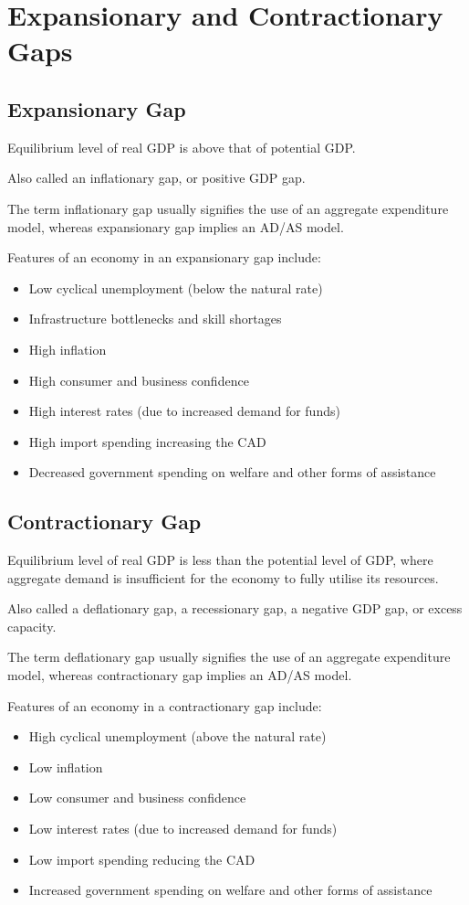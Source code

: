 \documentclass[a4paper,11pt]{article}
\begin{document}
\section{Expansionary and Contractionary Gaps}

\subsection{Expansionary Gap}

Equilibrium level of real GDP is above that of potential GDP.

Also called an inflationary gap, or positive GDP gap.

The term inflationary gap usually signifies the use of an aggregate expenditure
model, whereas expansionary gap implies an AD/AS model.

Features of an economy in an expansionary gap include:

\begin{itemize}
\item Low cyclical unemployment (below the natural rate)
\item Infrastructure bottlenecks and skill shortages
\item High inflation
\item High consumer and business confidence
\item High interest rates (due to increased demand for funds)
\item High import spending increasing the CAD
\item Decreased government spending on welfare and other forms of assistance
\end{itemize}


\subsection{Contractionary Gap}

Equilibrium level of real GDP is less than the potential level of GDP, where
aggregate demand is insufficient for the economy to fully utilise its resources.

Also called a deflationary gap, a recessionary gap, a negative GDP gap, or
excess capacity.

The term deflationary gap usually signifies the use of an aggregate expenditure
model, whereas contractionary gap implies an AD/AS model.

Features of an economy in a contractionary gap include:

\begin{itemize}
\item High cyclical unemployment (above the natural rate)
\item Low inflation
\item Low consumer and business confidence
\item Low interest rates (due to increased demand for funds)
\item Low import spending reducing the CAD
\item Increased government spending on welfare and other forms of assistance
\end{itemize}
\end{document}

